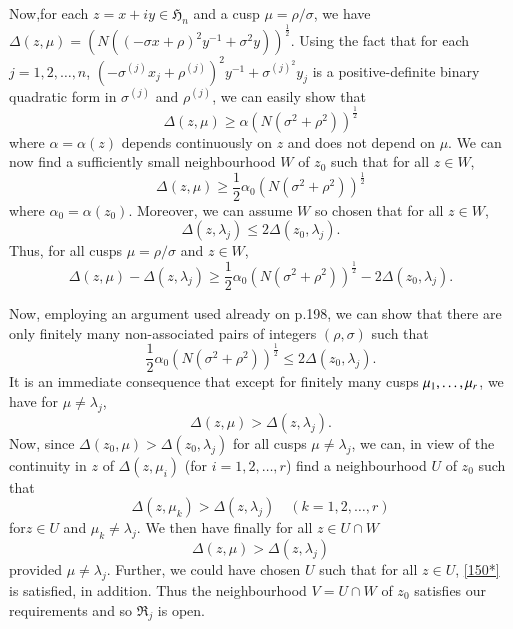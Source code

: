 Now,\pageoriginale for each $z=x+iy\in\mathfrak{H}_{n}$ and a cusp
$\mu=\rho/\sigma$, we have $\Delta(z,\mu)=(N((-\sigma
x+\rho)^{2}y^{-1}+\sigma^{2}y))^{\frac{1}{2}}$. Using the fact that
for each $j=1,2,\ldots,n$,
$(-\sigma^{(j)}x_{j}+\rho^{(j)})^{2}y^{-1}+\sigma^{(j)^{2}}y_{j}$ is a
positive-definite binary quadratic form in $\sigma^{(j)}$ and
$\rho^{(j)}$, we can easily show that
$$
\Delta(z,\mu)\geq \alpha(N(\sigma^{2}+\rho^{2}))^{\frac{1}{2}}
$$
where $\alpha=\alpha(z)$ depends continuously on $z$ and does not
depend on $\mu$. We can now find a sufficiently small neighbourhood
$W$ of $z_{0}$ such that for all $z\in W$,
$$
\Delta(z,\mu)\geq
\frac{1}{2}\alpha_{0}(N(\sigma^{2}+\rho^{2}))^{\frac{1}{2}}
$$
where $\alpha_{0}=\alpha(z_{0})$. Moreover, we can assume $W$ so
chosen that for all $z\in W$,
$$
\Delta(z,\lambda_{j})\leq 2\Delta(z_{0},\lambda_{j}).
$$
Thus, for all cusps $\mu=\rho/\sigma$ and $z\in W$,
$$
\Delta(z,\mu)-\Delta(z,\lambda_{j})\geq
\frac{1}{2}\alpha_{0}(N(\sigma^{2}+\rho^{2}))^{\frac{1}{2}}-2\Delta(z_{0},\lambda_{j}).
$$

Now, employing an argument used already on p.\@ 198, we can show that
there are only finitely many non-associated pairs of integers
$(\rho,\sigma)$ such that
$$
\frac{1}{2}\alpha_{0}(N(\sigma^{2}+\rho^{2}))^{\frac{1}{2}}\leq
2\Delta(z_{0},\lambda_{j}). 
$$
It is an immediate consequence that except for finitely many cusps
$\mu_{1},\break\ldots,\mu_{r}$, we have for $\mu\neq \lambda_{j}$,
$$
\Delta(z,\mu)>\Delta(z,\lambda_{j}).
$$
Now, since $\Delta(z_{0},\mu)>\Delta(z_{0},\lambda_{j})$ for all cusps
$\mu\neq \lambda_{j}$, we can, in view of the continuity in $z$ of
$\Delta(z,\mu_{i})$ (for $i=1,2,\ldots,r$) find a neighbourhood $U$ of
$z_{0}$ such that
$$
\Delta(z,\mu_{k})>\Delta(z,\lambda_{j})\quad (k=1,2,\ldots,r)
$$
for\pageoriginale $z\in U$ and $\mu_{k}\neq \lambda_{j}$. We then have
finally for all $z\in U\cap W$
$$
\Delta(z,\mu)>\Delta(z,\lambda_{j})
$$
provided $\mu\neq \lambda_{j}$. Further, we could have chosen $U$ such
that for all $z\in U$, \eqref{150*} is satisfied, in addition. Thus
the neighbourhood $V=U\cap W$ of $z_{0}$ satisfies our requirements
and so $\mathfrak{R}_{j}$ is open.

